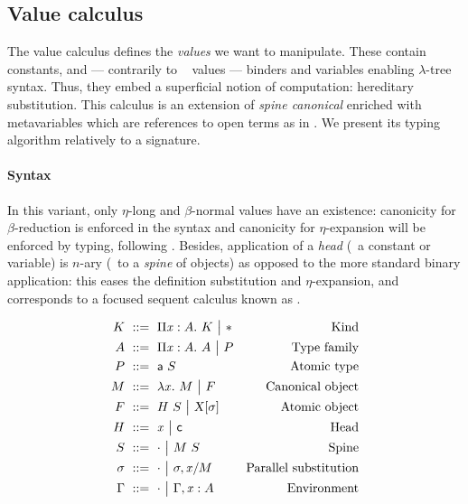 \documentclass{llncs}
\begin{document}
\subsection{Value calculus}

The value calculus defines the \emph{values} we want to
manipulate. These contain constants, and --- contrarily to \eg\
 values --- binders and variables enabling $\lambda$-tree
syntax. Thus, they embed a superficial notion of computation:
hereditary substitution. This calculus is an extension of \emph{spine
  canonical \LF} \cite{pfenning2007term} enriched with metavariables
which are references to open terms as in
\cite{nanevski2008contextual}. We present its typing algorithm
relatively to a signature. %

\paragraph{Syntax}

In this variant, only $\eta$-long and $\beta$-normal values have an
existence: canonicity for $\beta$-reduction is enforced in the syntax
and canonicity for $\eta$-expansion will be enforced by typing,
following \cite{hl07mechanizing}. Besides, application of a
\emph{head} (\ie\ a constant or variable) is $n$-ary (\ie\ to a
\emph{spine} of objects) as opposed to the more standard binary
application: this eases the definition substitution and
$\eta$-expansion, and corresponds to a focused sequent calculus known
as \sysname{LJT} \cite{herbelin1995λ}.

\begin{align*}
  K &\ ::=\ 
  \Pi{\ensuremath{\text{\textit{x}}}}:{A}.\  K \ {\big|}\ 
  \mathsf{*} &
  \text{Kind}\\
  A &\ ::=\ 
  \Pi{\ensuremath{\text{\textit{x}}}}:{A}.\  A \ {\big|}\ 
  P &
  \text{Type family} \\
  P &\ ::=\ 
  {\text{\textsf{a}}}\  S &
  \text{Atomic type} \\
  M &\ ::=\ 
  \lambda{\ensuremath{\text{\textit{x}}}}.\  M \ {\big|}\ 
  F &
  \text{Canonical object} \\
  F &\ ::=\  {H}\  S
  \ {\big|}\ 
  {\text{\textsl{X}}}[{\sigma}] &
  \text{Atomic object} \\
  H &\ ::=\ 
  \text{\textit{x}} \ {\big|}\ 
  \text{\textsf{c}} &
  \text{Head}\\
  S &\ ::=\ 
  \cdot \ {\big|}\ 
  {M}\ {S} &
  \text{Spine}\\
  \sigma &\ ::=\ 
  \cdot \ {\big|}\ 
  {\sigma},{{\text{\textit{x}}}/{M}} &
  \text{Parallel substitution} \\
  \Gamma &\ ::=\ 
  \cdot \ {\big|}\ 
  {\Gamma},{{\text{\textit{x}}}:{A}} &
  \text{Environment}
\end{align*}
\end{document}
